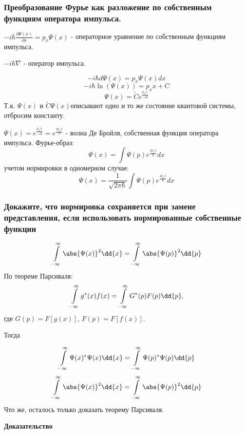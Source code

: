 \subsubsection{Преобразование Фурье как разложение по собственным функциям оператора импульса.}

$-i\hbar \frac{\partial{\Psi(x)}}{\partial x}=p_x \Psi(x)$ - операторное уравнение по собственным функциям импульса.

$-i\hbar \nabla$ - оператор импульса.

$$-i\hbar d\Psi(x)=p_x \Psi(x)dx$$
$$-i\hbar \ln(\Psi(x))=p_xx +C$$
$$\Psi(x)=\widetilde{C} e^{\frac{p_xx}{-i\hbar}}$$
Т.к. $\Psi(x)$ и $\widetilde{C} \Psi(x)$описывают одно и то же состояние квантовой системы, отбросим константу. 

$\Psi(x)=e^{\frac{p_xx}{-i\hbar}}=e^{\frac{ip_xx}{\hbar}}$ - волна Де Бройля, собственная функция оператора импульса. Фурье-образ:
$$\Psi(x)=\int \Psi(p) e^{\frac{ip_xx}{\hbar}} dx$$
 учетом нормировки в одномерном случае:
 $$\Psi(x)=\frac{1}{\sqrt{2\pi \hbar}}\int \Psi(p) e^{\frac{ip_xx}{\hbar}} dx$$

\subsubsection{Докажите, что нормировка сохраняется при замене представления, если использовать нормированные собственные функции }

$$\infint \abs{\Psi(x)}^2 \dd{x} = \infint \abs{\Psi(p)}^2 \dd{p}$$
По теореме Парсиваля:
$$\infint g^*(x) f(x)=\infint G^*(p) F(p) \dd{p}, $$
где $G(p)=F[g(x)]$, $F(p)=F[f(x)]$.

Тогда

$$\infint \Psi(x)^*\Psi(x) \dd{x} = \infint \Psi(p)^*\Psi(p) \dd{p} $$
$$\infint \abs{\Psi(x)}^2 \dd{x} = \infint \abs{\Psi(p)}^2\dd{p}  $$
Что же, осталось только доказать теорему Парсиваля.

{\centering\textbf{Доказательство} \\}

